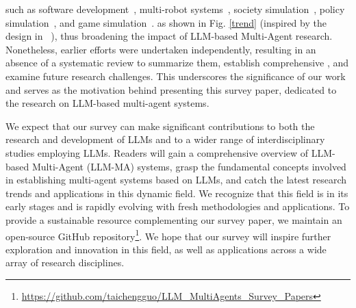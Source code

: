 such as software development~\cite{hong2023metagpt,qian2023communicative}, multi-robot systems~\cite{mandi2023roco,zhang2023building}, %
society simulation~\cite{park2023generative,park2022social}, policy simulation~\cite{xiao2023simulating,hua2023war}, and game simulation~\cite{xu2023language,wang2023avalon}. 
as shown in Fig. \ref{trend} (inspired by the design in ~\cite{gao2023retrieval}),
thus broadening the impact of LLM-based Multi-Agent research.
Nonetheless, earlier efforts were undertaken independently,  resulting in an absence of a systematic review to summarize them, establish comprehensive , and examine future research challenges. This underscores the significance of our work and serves as the motivation behind presenting this survey paper, dedicated to the research on LLM-based multi-agent systems.



We expect that our survey can make significant contributions to both the research and development of LLMs and to a wider range of interdisciplinary studies employing LLMs. Readers will gain a comprehensive overview of  LLM-based Multi-Agent (LLM-MA) systems, grasp the fundamental concepts involved in establishing multi-agent systems based on LLMs, and catch the latest research trends and applications in this dynamic field. We recognize that this field is in its early stages and is rapidly evolving with fresh methodologies and applications. To provide a sustainable resource complementing our survey paper, we maintain an open-source GitHub repository\footnote{\scriptsize \url{https://github.com/taichengguo/LLM_MultiAgents_Survey_Papers}}.
We hope that our survey will inspire further exploration and innovation in this field,
as well as applications across a wide array of research disciplines.

